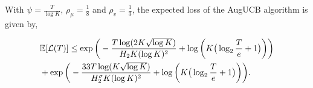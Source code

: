 \begin{theorem}
\label{Result:Theorem:1}
With $\psi=\frac{T}{\log K}$, $\rho_{\mu}=\frac{1}{8}$ and $\rho_v=\frac{1}{3}$,
the expected loss of the AugUCB algorithm is given by,
\begin{small}
\begin{align*}
&\mathbb{E}[\mathcal{L}(T)] \leq \exp\bigg( -\frac{T\log (2 K\sqrt{\log K})}{H_2 K (\log K)^2} + \log\bigg(K\big(\log_2\frac{T}{e}+1\big)\bigg)\bigg)\\
& + \exp\bigg(- \frac{33T\log ( K\sqrt{\log K})}{H_{2}^{\sigma} K(\log K)^2}  + \log\bigg(K\big(\log_2\frac{T}{e}+1\big)\bigg)\bigg).
\end{align*}
\end{small}
\end{theorem}

